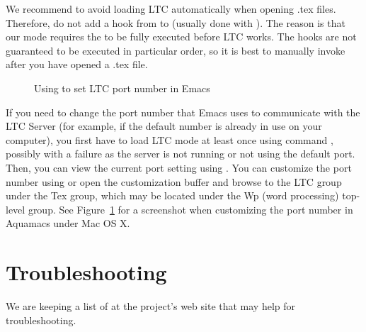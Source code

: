 We recommend to avoid loading LTC automatically when opening .tex files.  Therefore, do not add a hook from  to  (usually done with ).   The reason is that our mode requires the  to be fully executed before LTC works. The hooks are not guaranteed to be executed in particular order, so it is best to manually invoke  after you have opened a .tex file.

\begin{figure}[t]
\centering
{}
\caption{Using  to set LTC port number in Emacs} \label{fig:emacs-port}
\end{figure}

If you need to change the port number that Emacs uses to communicate with the LTC Server (for example, if the default number is already in use on your computer), you first have to load LTC mode at least once using command , possibly with a failure as the server is not running or not using the default port.  Then, you can view the current port setting using .  You can customize the port number using  or open the customization buffer and browse to the LTC group under the Tex group, which may be located under the Wp (word processing) top-level group.  See Figure~\ref{fig:emacs-port} for a screenshot when customizing the port number in Aquamacs under Mac OS X.

%

\section{Troubleshooting}

We are keeping a list of  at the project's web site that may help for troubleshooting.
